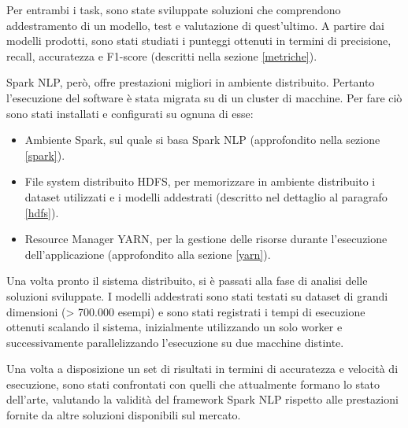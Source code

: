 Per entrambi i task, sono state sviluppate soluzioni che comprendono addestramento di un modello, test e valutazione di quest'ultimo. A partire dai modelli prodotti, sono stati studiati i punteggi ottenuti in termini di precisione, recall, accuratezza e F1-score (descritti nella sezione \ref{metriche}).

Spark NLP, però, offre prestazioni migliori in ambiente distribuito. Pertanto l'esecuzione del software è stata migrata su di un cluster di \clustersize{} macchine. Per fare ciò sono stati installati e configurati su ognuna di esse:
\begin{itemize}
    \item Ambiente Spark, sul quale si basa Spark NLP (approfondito nella sezione \ref{spark}).
    \item File system distribuito HDFS, per memorizzare in ambiente distribuito i dataset utilizzati e i modelli addestrati (descritto nel dettaglio al paragrafo \ref{hdfs}).
    \item Resource Manager YARN, per la gestione delle risorse durante l'esecuzione dell'applicazione (approfondito alla sezione \ref{yarn}). 
\end{itemize}

Una volta pronto il sistema distribuito, si è passati alla fase di analisi delle soluzioni sviluppate. I modelli addestrati sono stati testati su dataset di grandi dimensioni (> 700.000 esempi) e sono stati registrati i tempi di esecuzione ottenuti scalando il sistema, inizialmente utilizzando un solo worker e successivamente parallelizzando l'esecuzione su due macchine distinte.

Una volta a disposizione un set di risultati in termini di accuratezza e velocità di esecuzione, sono stati confrontati con quelli che attualmente formano lo stato dell'arte, valutando la validità del framework Spark NLP rispetto alle prestazioni fornite da altre soluzioni disponibili sul mercato.
